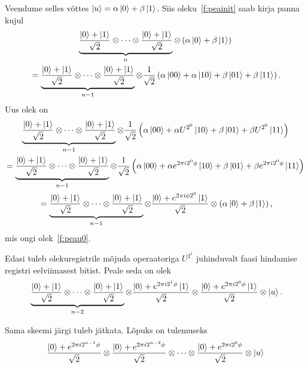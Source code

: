 \documentclass[12pt]{report}
\def\paren#1{\left(#1\right)}
\def\ket#1{\mathinner{|#1\rangle}}
\begin{document}
Veendume selles võttes \(\ket{u} = \alpha\ket{0} + \beta\ket{1}\).
Siis oleku~\ref{f:peainit} saab kirja panna kujul
\begin{multline}
    \underbrace{\frac{\ket{0}+\ket{1}}{\sqrt{2}}
    \otimes \cdots
    \otimes \frac{\ket{0}+\ket{1}}{\sqrt{2}}}_n
    \otimes \paren{\alpha \ket{0} + \beta \ket{1}} \\
    = \underbrace{\frac{\ket{0}+\ket{1}}{\sqrt{2}}
    \otimes \cdots
    \otimes \frac{\ket{0}+\ket{1}}{\sqrt{2}}}_{n - 1}
    \otimes \frac{1}{\sqrt{2}} \paren{
        \alpha \ket{00} + \alpha \ket{10}
        + \beta \ket{01} + \beta \ket{11}
    } \rlap{.}
\end{multline}
Uus olek on
\begin{multline}
    \underbrace{\frac{\ket{0}+\ket{1}}{\sqrt{2}}
    \otimes \cdots
    \otimes \frac{\ket{0}+\ket{1}}{\sqrt{2}}}_{n - 1}
    \otimes \frac{1}{\sqrt{2}} \paren{
        \alpha \ket{00} + \alpha U^{2^0} \ket{10}
        + \beta \ket{01} + \beta U^{2^0} \ket{11}
    } \\
    = \underbrace{\frac{\ket{0}+\ket{1}}{\sqrt{2}}
    \otimes \cdots
    \otimes \frac{\ket{0}+\ket{1}}{\sqrt{2}}}_{n - 1}
    \otimes \frac{1}{\sqrt{2}} \paren{
        \alpha \ket{00} + \alpha e^{2\pi i2^0\phi} \ket{10}
        + \beta \ket{01} + \beta e^{2\pi i2^0\phi} \ket{11}
    } \\
    = \underbrace{\frac{\ket{0}+\ket{1}}{\sqrt{2}}
    \otimes \cdots
    \otimes \frac{\ket{0}+\ket{1}}{\sqrt{2}}}_{n - 1}
    \otimes \frac{\ket{0} + e^{2\pi i\phi 2^0} \ket{1}}{\sqrt{2}}
    \otimes \paren{\alpha \ket{0} + \beta \ket{1}} \rlap{,}
\end{multline}
mis ongi olek~\ref{f:peau0}.

Edasi tuleb olekuregistrile mõjuda operaatoriga \(U^{2^1}\) juhinduvalt faasi hindamise registri eelviimasest bitist.
Peale seda on olek
\begin{align}
    \underbrace{\frac{\ket{0} + \ket{1}}{\sqrt{2}}
    \otimes \cdots
    \otimes \frac{\ket{0} + \ket{1}}{\sqrt{2}}
    }_{n-2}
    \otimes \frac{\ket{0} + e^{2\pi i2^1\phi} \ket{1}}{\sqrt{2}}
    \otimes \frac{\ket{0} + e^{2\pi i2^0\phi} \ket{1}}{\sqrt{2}}
    \otimes \ket{u} \rlap{.}
\end{align}

Sama skeemi järgi tuleb jätkata.
Lõpuks on tulemuseks
\begin{align}\label{f:peauend}
    \frac{\ket{0}+ e^{2\pi i2^{n-1}\phi}}{\sqrt{2}}
    \otimes \frac{\ket{0}+ e^{2\pi i2^{n-2}\phi}}{\sqrt{2}}
    \otimes\cdots
    \otimes \frac{\ket{0}+ e^{2\pi i2^0\phi}}{\sqrt{2}}
    \otimes\ket{u}
\end{align}
\end{document}
